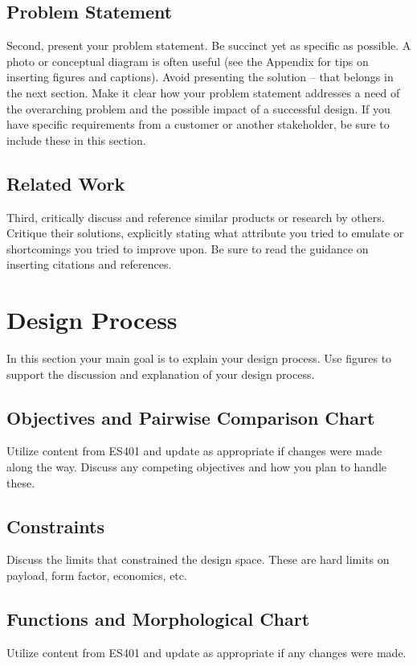 \documentclass{wsecapstone}
\begin{document}
\subsection{Problem Statement}
Second, present your problem statement.   Be succinct yet as specific as possible.  A photo or conceptual diagram is often useful (see the Appendix for tips on inserting figures and captions).   Avoid presenting the solution – that belongs in the next section.  Make it clear how your problem statement addresses a need of the overarching problem and the possible impact of a successful design.  If you have specific requirements from a customer or another stakeholder, be sure to include these in this section.

\subsection{Related Work}
Third, critically discuss and reference similar products or research by others.  Critique their solutions, explicitly stating what attribute you tried to emulate or shortcomings you tried to improve upon.  Be sure to read the guidance on inserting citations and references.





\section{Design Process}
In this section your main goal is to explain your design process. Use figures to support the discussion and explanation of your design process.
 
\subsection{Objectives and Pairwise Comparison Chart}
Utilize content from ES401 and update as appropriate if changes were made along the way. Discuss any competing objectives and how you plan to handle these.

\subsection{Constraints}
Discuss the limits that constrained the design space. These are hard limits on payload, form factor, economics, etc. 

\subsection{Functions and Morphological Chart}
Utilize content from ES401 and update as appropriate if any changes were made. 
\end{document}
